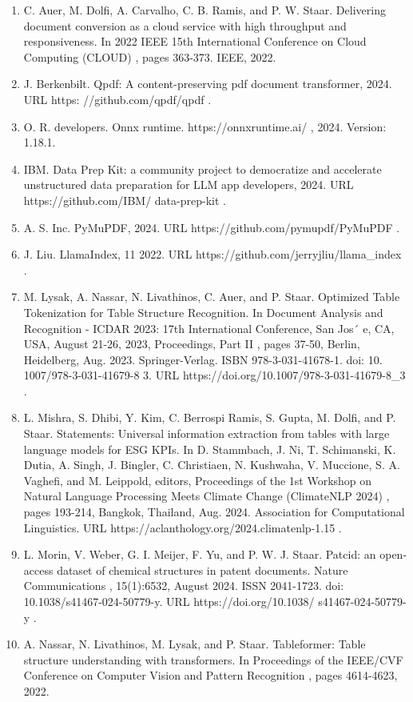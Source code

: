 \documentclass[11pt,a4paper]{article}
\begin{document}
\begin{enumerate}
\item C. Auer, M. Dolfi, A. Carvalho, C. B. Ramis, and P. W. Staar. Delivering document conversion as a cloud service with high throughput and responsiveness. In 2022 IEEE 15th International Conference on Cloud Computing (CLOUD) , pages 363-373. IEEE, 2022.
\item J. Berkenbilt. Qpdf: A content-preserving pdf document transformer, 2024. URL https: //github.com/qpdf/qpdf .
\item O. R. developers. Onnx runtime. https://onnxruntime.ai/ , 2024. Version: 1.18.1.
\item IBM. Data Prep Kit: a community project to democratize and accelerate unstructured data preparation for LLM app developers, 2024. URL https://github.com/IBM/ data-prep-kit .
\item A. S. Inc. PyMuPDF, 2024. URL https://github.com/pymupdf/PyMuPDF .
\item J. Liu. LlamaIndex, 11 2022. URL https://github.com/jerryjliu/llama\_index .
\item M. Lysak, A. Nassar, N. Livathinos, C. Auer, and P. Staar. Optimized Table Tokenization for Table Structure Recognition. In Document Analysis and Recognition - ICDAR 2023: 17th International Conference, San Jos´ e, CA, USA, August 21-26, 2023, Proceedings, Part II , pages 37-50, Berlin, Heidelberg, Aug. 2023. Springer-Verlag. ISBN 978-3-031-41678-1. doi: 10. 1007/978-3-031-41679-8 3. URL https://doi.org/10.1007/978-3-031-41679-8\_3 .
\item L. Mishra, S. Dhibi, Y. Kim, C. Berrospi Ramis, S. Gupta, M. Dolfi, and P. Staar. Statements: Universal information extraction from tables with large language models for ESG KPIs. In D. Stammbach, J. Ni, T. Schimanski, K. Dutia, A. Singh, J. Bingler, C. Christiaen, N. Kushwaha, V. Muccione, S. A. Vaghefi, and M. Leippold, editors, Proceedings of the 1st Workshop on Natural Language Processing Meets Climate Change (ClimateNLP 2024) , pages 193-214, Bangkok, Thailand, Aug. 2024. Association for Computational Linguistics. URL https://aclanthology.org/2024.climatenlp-1.15 .
\item L. Morin, V. Weber, G. I. Meijer, F. Yu, and P. W. J. Staar. Patcid: an open-access dataset of chemical structures in patent documents. Nature Communications , 15(1):6532, August 2024. ISSN 2041-1723. doi: 10.1038/s41467-024-50779-y. URL https://doi.org/10.1038/ s41467-024-50779-y .
\item A. Nassar, N. Livathinos, M. Lysak, and P. Staar. Tableformer: Table structure understanding with transformers. In Proceedings of the IEEE/CVF Conference on Computer Vision and Pattern Recognition , pages 4614-4623, 2022.

\end{enumerate}
\end{document}
